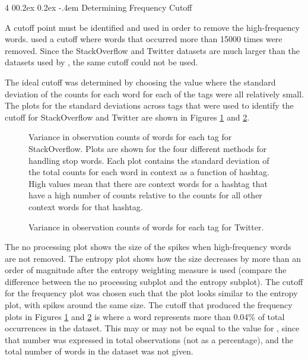 \documentclass[man,floatsintext,donotrepeattitle]{apa6}
\makeatletter
\renewcommand{\paragraph}{%
  \@startsection
  {paragraph}%
  {4}%
  {\parindent}%
  {0\baselineskip \@plus 0.2ex \@minus 0.2ex}%
  {-.4em}%
  {\normalfont\normalsize\bfseries\itshape\addperi}}
\makeatother
\begin{document}
\paragraph{Determining Frequency Cutoff}

A cutoff point must be identified and used in order to remove the high-frequency words.
\textcite{Sahlgren2008} used a cutoff where words that occurred more than \num{15000} times were removed.
Since the StackOverflow and Twitter datasets are much larger than the datasets used by \citeauthor{Sahlgren2008}, the same cutoff could not be used.

The ideal cutoff was determined by choosing the value where the standard deviation of the counts for each word for each of the tags were all relatively small.
The plots for the standard deviations across tags that were used to identify the cutoff for StackOverflow and Twitter are shown in Figures \ref{figContextCutoffSO} and \ref{figContextCutoffT}.

\begin{figure}[!htbp]
  \caption{
    Variance in observation counts of words for each tag for StackOverflow.
    Plots are shown for the four different methods for handling stop words.
    Each plot contains the standard deviation of the total counts for each word in context as a function of hashtag.
    High values mean that there are context words for a hashtag that have a high number of counts relative to the counts for all other context words for that hashtag.
  }
  \label{figContextCutoffSO}
\end{figure}

\begin{figure}[!htbp]
  \caption{
    Variance in observation counts of words for each tag for Twitter.
  }
  \label{figContextCutoffT}
\end{figure}

The no processing plot shows the size of the spikes when high-frequency words are not removed.
The entropy plot shows how the size decreases by more than an order of magnitude after the entropy weighting measure is used (compare the difference between the no processing subplot and the entropy subplot).
The cutoff for the frequency plot was chosen such that the plot looks similar to the entropy plot, with spikes around the same size.
The cutoff that produced the frequency plots in Figures \ref{figContextCutoffSO} and \ref{figContextCutoffT} is where a word represents more than \num{.04}\% of total occurrences in the dataset.
This may or may not be equal to the value for \textcite{Sahlgren2008}, since that number was expressed in total observations (not as a percentage), and the total number of words in the dataset was not given.
\end{document}
